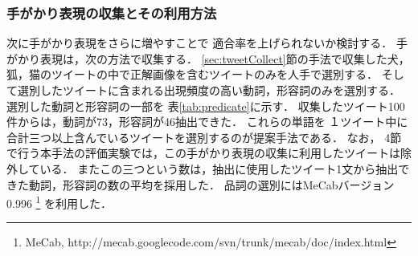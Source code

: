 \documentclass{deimj}
\begin{document}


\subsubsection{手がかり表現の収集とその利用方法}

次に手がかり表現をさらに増やすことで
適合率を上げられないか検討する．
手がかり表現は，次の方法で収集する．
%
\ref{sec:tweetCollect}節の手法で収集した犬，狐，猫のツイートの中で正解画像を含むツイートのみを人手で選別する．
そして選別したツイートに含まれる出現頻度の高い動詞，形容詞のみを選別する．
選別した動詞と形容詞の一部を
表\ref{tab:predicate}に示す．
収集したツイート100件からは，動詞が73，形容詞が46抽出できた．
これらの単語を
１ツイート中に合計三つ以上含んでいるツイートを選別するのが提案手法である．
なお，
4節で行う本手法の評価実験では，この手がかり表現の収集に利用したツイートは除外している．
またこの三つという数は，抽出に使用したツイート1文から抽出できた動詞，形容詞の数の平均を採用した．
品詞の選別にはMeCabバージョン0.996
\footnote{MeCab, http:\slash\slash{}mecab.googlecode.com\slash{}svn\slash{}trunk\slash{}mecab\slash{}doc\slash{}index.html}
を利用した．



\end{document}
